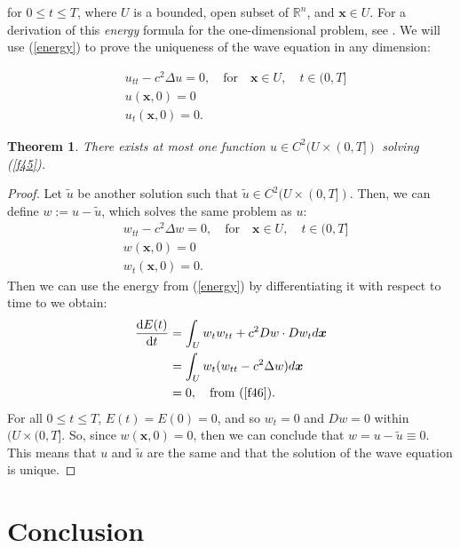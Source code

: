 \documentclass[a4paper, 12pt]{article}
\numberwithin{equation}{section}
\begin{document}
for $0 \le t \le T$, where $U$ is a bounded, open subset of $\mathbb{R}^n$, and
$\boldsymbol{x} \in U$. For a derivation of this \emph{energy} formula for the
one-dimensional problem, see \cite[Ch. 3.6.4]{Kev}. We will use
(\ref{energy}) to prove the uniqueness of the wave equation in any dimension:

\begin{equation} \label{f45}
    \begin{aligned}
        &u_{tt}-c^2\Delta u =0, \quad \textrm{for} \quad \boldsymbol{x} \in U, \quad t \in (0,T]\\
        &u(\boldsymbol{x}, 0)=0\\
        &u_t(\boldsymbol{x}, 0)=0.
    \end{aligned}
\end{equation}

\newtheorem*{theorem}{Theorem}
\begin{theorem}
    There exists at most one function $u \in C^2(U \times (0,T])$ solving
    (\ref{f45}).
\end{theorem}

\begin{proof}
    Let $\tilde{u}$ be another solution such that $\tilde{u} \in C^2(U \times
    (0,T])$. Then, we can define $w:=u-\tilde{u}$, which solves the same problem
    as $u$:
    \begin{equation} \label{f46}
        \begin{aligned}
            &w_{tt}-c^2\Delta w =0, \quad \textrm{for} \quad \boldsymbol{x} \in U, \quad t \in (0,T]\\
            &w(\boldsymbol{x}, 0)=0\\
            &w_t(\boldsymbol{x}, 0)=0.
        \end{aligned}
    \end{equation}
    Then we can use the energy from (\ref{energy}) by differentiating it with respect
    to time to we obtain:
    \begin{equation*}
        \begin{aligned}
            \diff{E(t)}{t}&=\int_U w_t w_{tt} + c^2 Dw \cdot Dw_t d\boldsymbol{x}\\
            &=\int_U w_t (w_{tt}-c^2 \Delta w)d\boldsymbol{x}\\
            &=0, \quad \textrm{from (\ref{f46})}.
        \end{aligned}
    \end{equation*}
    For all $0 \le t \le T$, $E(t)=E(0)=0$, and so
    $w_t=0$ and $Dw=0$ within $(U \times (0, T]$. So, since
    $w(\boldsymbol{x}, 0)=0$, then we can conclude that $w=u-\tilde{u}\equiv 0$.
    This means that $u$ and $\tilde{u}$ are the same and that the solution of
    the wave equation is unique.
\renewcommand\qedsymbol{q.e.d.}
\end{proof}

\section{Conclusion}

\newpage 



\end{document}
